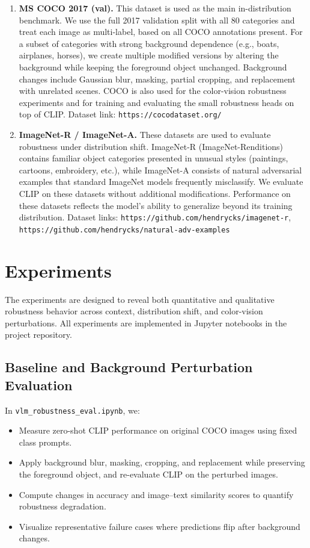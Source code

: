\documentclass[11pt]{article}
\begin{document}
\begin{enumerate}
    \item \textbf{MS COCO 2017 (val).}
    This dataset is used as the main in-distribution benchmark. We use the full 2017 validation split with all 80 categories and treat each image as multi-label, based on all COCO annotations present. For a subset of categories with strong background dependence (e.g., boats, airplanes, horses), we create multiple modified versions by altering the background while keeping the foreground object unchanged. Background changes include Gaussian blur, masking, partial cropping, and replacement with unrelated scenes. COCO is also used for the color-vision robustness experiments and for training and evaluating the small robustness heads on top of CLIP.  
    Dataset link: \texttt{https://cocodataset.org/}

    \item \textbf{ImageNet-R / ImageNet-A.}
    These datasets are used to evaluate robustness under distribution shift. ImageNet-R (ImageNet-Renditions) contains familiar object categories presented in unusual styles (paintings, cartoons, embroidery, etc.), while ImageNet-A consists of natural adversarial examples that standard ImageNet models frequently misclassify. We evaluate CLIP on these datasets without additional modifications. Performance on these datasets reflects the model’s ability to generalize beyond its training distribution.  
    Dataset links: \texttt{https://github.com/hendrycks/imagenet-r}, \texttt{https://github.com/hendrycks/natural-adv-examples}

\end{enumerate}

\section{Experiments}

The experiments are designed to reveal both quantitative and qualitative robustness behavior across context, distribution shift, and color-vision perturbations. All experiments are implemented in Jupyter notebooks in the project repository.

\subsection{Baseline and Background Perturbation Evaluation}

In \texttt{vlm\_robustness\_eval.ipynb}, we:
\begin{itemize}
    \item Measure zero-shot CLIP performance on original COCO images using fixed class prompts.
    \item Apply background blur, masking, cropping, and replacement while preserving the foreground object, and re-evaluate CLIP on the perturbed images.
    \item Compute changes in accuracy and image--text similarity scores to quantify robustness degradation.
    \item Visualize representative failure cases where predictions flip after background changes.
\end{itemize}
\end{document}
